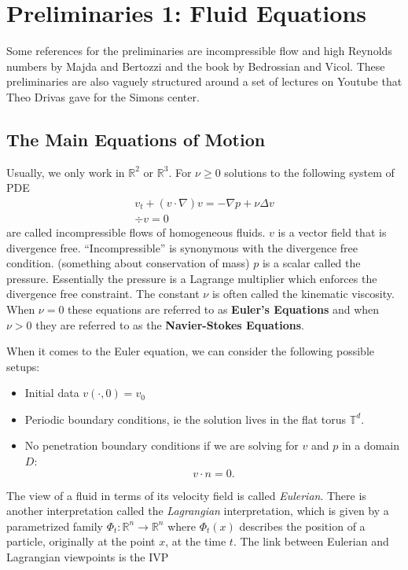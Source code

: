 


\rhead{\today} 

\chapter{Preliminaries 1: Fluid Equations}

Some references for the preliminaries are incompressible flow and high Reynolds numbers by Majda and Bertozzi and the book by Bedrossian and Vicol. These preliminaries are also vaguely structured around a set of lectures on Youtube that Theo Drivas gave for the Simons center.


\section{The Main Equations of Motion}
Usually, we only work in $\mathbb{R}^2$ or $\mathbb{R}^3$. For $\nu \geq 0$ solutions to the following system of PDE
\begin{gather}
    v_t + (v \cdot \nabla)v = -\nabla p + \nu \Delta v \\
    \div v = 0
\end{gather}
are called incompressible flows of homogeneous fluids. $v$ is a vector field that is divergence free. ``Incompressible'' is synonymous with the divergence free condition. (something about conservation of mass) $p$ is a scalar called the pressure. Essentially the pressure is a Lagrange multiplier which enforces the divergence free constraint. The constant $\nu$ is often called the kinematic viscosity. When $\nu = 0$ these equations are referred to as \textbf{Euler's Equations} and when $\nu > 0$ they are referred to as the \textbf{Navier-Stokes Equations}.

When it comes to the Euler equation, we can consider the following possible setups:
\begin{itemize}
    \item Initial data $v(\cdot, 0) = v_0$
    \item Periodic boundary conditions, ie the solution lives in the flat torus $\mathbb{T}^d$.
    \item No penetration boundary conditions if we are solving for $v$ and $p$ in a domain $D$:
    \[v \cdot n = 0.\]
\end{itemize}

The view of a fluid in terms of its velocity field is called \textit{Eulerian}. There is another interpretation called the \textit{Lagrangian} interpretation, which is given by a parametrized family $\Phi_t: \mathbb{R}^n \to \mathbb{R}^n$ where $\Phi_t(x)$ describes the position of a particle, originally at the point $x$, at the time $t$. The link between Eulerian and Lagrangian viewpoints is the IVP

